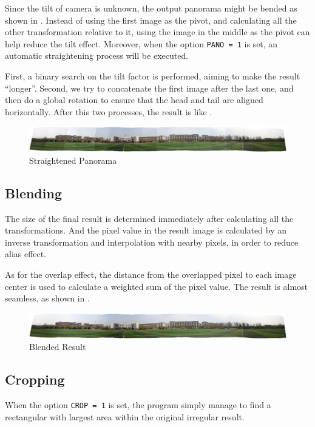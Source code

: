 Since the tilt of camera is unknown, the output panorama might be bended as shown in .
Instead of using the first image as the pivot, and calculating all the other transformation relative to it,
using the image in the middle as the pivot can help reduce the tilt effect.
Moreover, when the option \verb|PANO = 1| is set, an automatic straightening process will be executed.

First, a binary search on the tilt factor is performed, aiming to make the result ``longer''.
Second, we try to concatenate the first image after the last one,
and then do a global rotation to ensure that the head and tail are aligned horizontally.
After this two processes, the result is like .

\begin{figure}[H]
  \centering
  \includegraphics[width=\textwidth]{res/unbend.png}
  \caption{Straightened Panorama\label{fig:unbend}}
\end{figure}

\subsection{Blending}
The size of the final result is determined immediately after calculating all the transformations.
And the pixel value in the result image is calculated by an inverse transformation and interpolation with nearby pixels,
in order to reduce alias effect.

As for the overlap effect, the distance from the overlapped pixel to each image center is used to calculate a weighted sum of the pixel value.
The result is almost seamless, as shown in .
\begin{figure}[H]
  \centering
  \includegraphics[width=\textwidth]{res/blend.png}
  \caption{Blended Result\label{fig:blend}}
\end{figure}

\subsection{Cropping}
When the option \verb|CROP = 1| is set,
the program simply manage to find a rectangular with largest area within the original irregular result.

